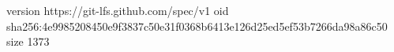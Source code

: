version https://git-lfs.github.com/spec/v1
oid sha256:4e9985208450e9f3837c50e31f0368b6413e126d25ed5ef53b7266da98a86c50
size 1373
